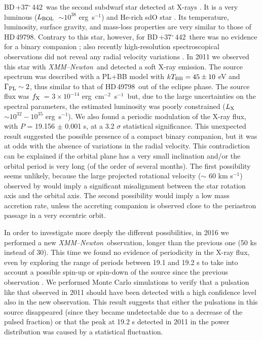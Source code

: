 \documentclass[USenglish,twocolumn]{article}
\def\XMM{{\em XMM--Newton}}
\def\BDone{BD\,+37$^\circ$\,442}
\def\HDone{HD\,49798}
\def\flux {\mbox{erg cm$^{-2}$ s$^{-1}$}}
\def\lum {\mbox{erg s$^{-1}$}}
\def\lx {$L_{\rm X}$}
\def\fx {$f_{\rm X}$}
\def\lbol {$L_{\rm BOL}$}
\begin{document}
\BDone\ was the second subdwarf star detected at X-rays \citep{LaPalombara+12}. It is a very luminous (\lbol\ $\sim 10^{38}$ \lum) and He-rich sdO star \citep{Rebeirot66,Husfeld87}. Its temperature, luminosity, surface gravity, and mass-loss properties are very similar to those of \HDone. Contrary to this star, however, for \BDone\ there was no evidence for a binary companion \citep{FayHoneycuttWarren73,KaufmannTheil80,DworetskyWhitelockCarnochan82}; also recently high-resolution spectroscopical observations did not reveal any radial velocity variations \citep{Heber+14}. In 2011 we observed this star with \XMM\ and detected a soft X-ray emission. The source spectrum was described with a PL+BB model with $kT_{\rm BB} = 45 \pm 10$ eV and $\Gamma_{\rm PL} \sim 2$, thus similar to that of \HDone\ out of the eclipse phase. The source flux was \fx\ = $3\times 10^{-14}$ \flux\ but, due to the large uncertainties on the spectral parameters, the estimated luminosity was poorly constrained (\lx\ $\sim 10^{32} - 10^{35}$ \lum). We also found a periodic modulation of the X-ray flux, with $P$ = 19.156 $\pm$ 0.001 s, at a 3.2 $\sigma$ statistical significance. This unexpected result suggested the possible presence of a compact binary companion, but it was at odds with the absence of variations in the radial velocity. This contradiction can be explained if the orbital plane has a very small inclination and/or the orbital period is very long (of the order of several months). The first possibility seems unlikely, because the large projected rotational velocity ($\sim$ 60 km s$^{-1}$) observed by \citet{Heber+14} would imply a significant misalignment between the star rotation axis and the orbital axis. The second possibility would imply a low mass accretion rate, unless the accreting companion is observed close to the periastron passage in a very eccentric orbit.

In order to investigate more deeply the different possibilities, in 2016 we performed a new \XMM\ observation, longer than the previous one (50 ks instead of 30). This time we found no evidence of periodicity in the X-ray flux, even by exploring the range of periods between 19.1 and 19.2 s to take into account a possible spin-up or spin-down of the source since the previous observation \citep{Mereghetti+17}. We performed Monte Carlo simulations to verify that a pulsation like that observed in 2011 should have been detected with a high confidence level also in the new observation. This result suggests that either the pulsations in this source disappeared (since they became undetectable due to a decrease of the pulsed fraction) or that the peak at 19.2 s detected in 2011 in the power distribution was caused by a statistical fluctuation.
\end{document}
